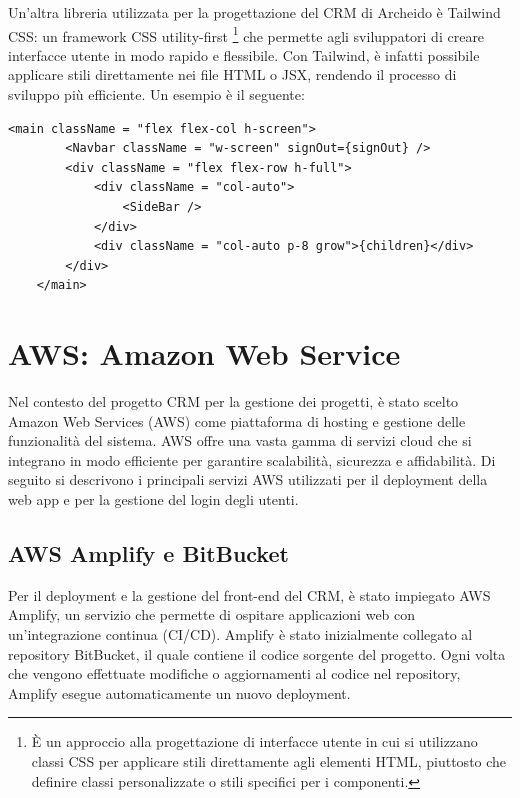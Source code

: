 \documentclass[target=bach,aauheader=,style=]{thud}
\begin{document}
\noindent Un'altra libreria utilizzata per la progettazione del CRM di Archeido è Tailwind CSS: un framework CSS utility-first \footnote{È un approccio alla progettazione di interfacce utente in cui si utilizzano classi CSS per applicare stili direttamente agli elementi HTML, piuttosto che definire classi personalizzate o stili specifici per i componenti.} che permette agli sviluppatori di creare interfacce utente in modo rapido e flessibile. Con Tailwind, è infatti possibile applicare stili direttamente nei file HTML o JSX, rendendo il processo di sviluppo più efficiente. Un esempio è il seguente:

\begin{lstlisting}[caption=Parte del file \texttt{app.tsx} del CRM]
    <main className = "flex flex-col h-screen">
        <Navbar className = "w-screen" signOut={signOut} />
        <div className = "flex flex-row h-full">
            <div className = "col-auto">
                <SideBar />
            </div>
            <div className = "col-auto p-8 grow">{children}</div>
        </div>
    </main> 
\end{lstlisting}


\section{AWS: Amazon Web Service}
Nel contesto del progetto CRM per la gestione dei progetti, è stato scelto Amazon Web Services (AWS) come piattaforma di hosting e gestione delle funzionalità del sistema. AWS offre una vasta gamma di servizi cloud che si integrano in modo efficiente per garantire scalabilità, sicurezza e affidabilità. Di seguito si descrivono i principali servizi AWS utilizzati per il deployment della web app e per la gestione del login degli utenti.

\subsection{AWS Amplify e BitBucket}
Per il deployment e la gestione del front-end del CRM, è stato impiegato AWS Amplify, un servizio che permette di ospitare applicazioni web con un'integrazione continua (CI/CD). Amplify è stato inizialmente collegato al repository BitBucket, il quale contiene il codice sorgente del progetto. Ogni volta che vengono effettuate modifiche o aggiornamenti al codice nel repository, Amplify esegue automaticamente un nuovo deployment.
\end{document}
